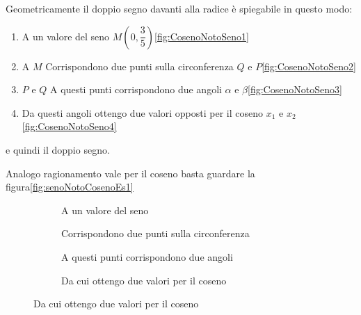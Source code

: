 Geometricamente il doppio segno davanti alla radice è spiegabile in questo modo:
\begin{enumerate}
	\item A un valore del seno $M(0,\dfrac{3}{5})$\nobs\vref{fig:CosenoNotoSeno1}
	\item A $M$ Corrispondono due punti sulla circonferenza $Q$ e $P$\nobs\vref{fig:CosenoNotoSeno2}
	\item $P$ e $Q$ A questi punti corrispondono due angoli $\alpha$ e $\beta$\nobs\vref{fig:CosenoNotoSeno3}
	\item  Da questi angoli ottengo due valori opposti per il coseno $x_1$ e $x_2$\nobs\vref{fig:CosenoNotoSeno4}
	\end{enumerate}
e quindi il doppio segno.

Analogo ragionamento vale per il coseno basta guardare la figura\nobs\vref{fig:senoNotoCosenoEs1}
\begin{figure}
	\begin{subfigure}[b]{.5\linewidth}
		\centering
			\caption{A un valore del seno}\label{fig:CosenoNotoSeno1}
	\end{subfigure}%
	\begin{subfigure}[b]{.5\linewidth}
		\centering
			\caption{Corrispondono due punti sulla circonferenza}\label{fig:CosenoNotoSeno2}
	\end{subfigure}
	\begin{subfigure}[b]{.5\linewidth}
		\centering
			\caption{A questi punti corrispondono due angoli}\label{fig:CosenoNotoSeno3}
	\end{subfigure}%
	\begin{subfigure}[b]{.5\linewidth}
		\centering
			\caption{Da cui ottengo due valori per il coseno}\label{fig:CosenoNotoSeno4}
	\end{subfigure}
	\label{fig:CosenoNotoSenoEs1}
\end{figure}
